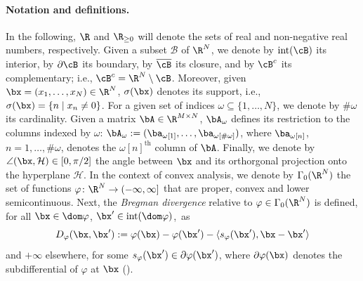\documentclass[11pt]{amsart}
\newcommand{\jc}[1]{{\color{red}#1}}
\begin{document}
\paragraph{\textbf{Notation and definitions.}} 
In the following, $\R$ and $\R_{\geq 0}$ will denote the sets of real and non-negative real numbers, respectively. Given a subset $\mathcal{B}$ of $\R^N$, we denote by $\mathrm{int}(\cB)$ its interior, by $\partial\cB$ its boundary, by $\overline{\cB}$ its closure, and by $\cB^c$ its complementary; i.e., $\cB^c=\R^N\setminus\cB$. Moreover, given $\bx=(x_1,\ldots, x_N)\in\R^N$, $\sigma(\bx)$ denotes its support, i.e., $\sigma(\bx)=\{n \mid x_n\neq 0 \}$. For a given set of indices $\omega\subseteq\{1,\ldots, N\}$, we denote by $\#\omega$ its cardinality. Given a matrix $\bA\in\R^{M\times N}$, $\bA_\omega$ defines its restriction to the columns indexed by $\omega$: $\bA_\omega:=(\ba_{\omega[1]},\ldots,\ba_{\omega[\# \omega]})$, where $\ba_{\omega[n]}$, $n=1,\ldots,\# \omega$, denotes the $\omega[n]^{\mathrm{th}}$ column of $\bA$. Finally, we denote by $\angle(\bx,\mathcal{H})\in[0,\pi/2]$ the angle between $\bx$ and its orthorgonal projection onto the hyperplane $\mathcal{H}$.
In the context of convex analysis, we denote by $\Gamma_0(\R^N)$ the set of functions $\varphi\colon \R^N\to(-\infty,\infty]$ that are proper, convex and lower semicontinuous. Next, the \emph{Bregman divergence} relative to $\varphi\in\Gamma_0(\R^N)$ is defined, for all $\bx\in\dom \varphi$, $\bx'\in\mathrm{int}(\dom \varphi)$,~as
$$
D_\varphi(\bx,\bx'):= \varphi(\bx)-\varphi(\bx')-\langle s_\varphi(\bx'),\bx-\bx'\rangle
$$
and $+\infty$ elsewhere, for some $s_\varphi(\bx')\in\partial \varphi(\bx')$,  where $\partial \varphi(\bx)$ denotes the subdifferential of $\varphi$ at $\bx$ (\cite[Definition 16.1]{BCombettes}).
\end{document}
